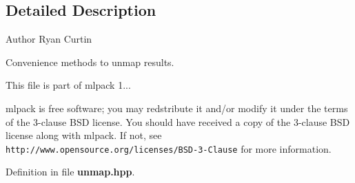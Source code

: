 \subsection{Detailed Description}
\begin{DoxyAuthor}{Author}
Ryan Curtin
\end{DoxyAuthor}
Convenience methods to unmap results.

This file is part of mlpack 1...

mlpack is free software; you may redstribute it and/or modify it under the terms of the 3-\/clause B\-S\-D license. You should have received a copy of the 3-\/clause B\-S\-D license along with mlpack. If not, see {\tt http\-://www.\-opensource.\-org/licenses/\-B\-S\-D-\/3-\/\-Clause} for more information. 

Definition in file {\bf unmap.\-hpp}.

